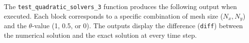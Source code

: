 \documentclass{article}
\begin{document}

				
		The \texttt{test\_quadratic\_solvers\_3} function produces the following output when executed. Each block corresponds to a specific combination of mesh size (\(N_x, N_y\)) and the \(\theta\)-value (1, 0.5, or 0). The outputs display the difference (\texttt{diff}) between the numerical solution and the exact solution at every time step.
		
\end{document}
